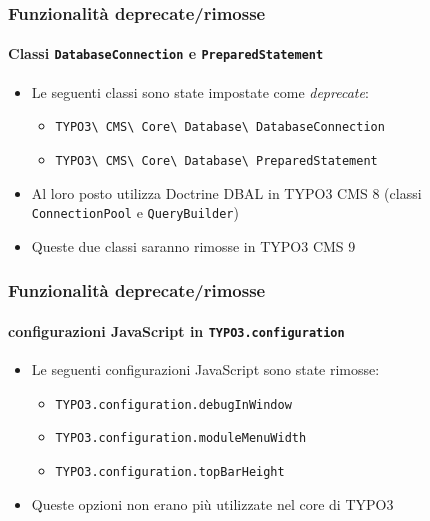 \begin{frame}[fragile]
	\frametitle{Funzionalità deprecate/rimosse}
	\framesubtitle{Classi \texttt{DatabaseConnection} e \texttt{PreparedStatement}}

	\begin{itemize}
		\item Le seguenti classi sono state impostate come \textit{deprecate}:
			\begin{itemize}
				\item \texttt{TYPO3\textbackslash
						CMS\textbackslash
						Core\textbackslash
						Database\textbackslash
						DatabaseConnection}
				\item \texttt{TYPO3\textbackslash
						CMS\textbackslash
						Core\textbackslash
						Database\textbackslash
						PreparedStatement}
			\end{itemize}
		\item Al loro posto utilizza Doctrine DBAL in TYPO3 CMS 8\newline
				(classi \texttt{ConnectionPool} e \texttt{QueryBuilder})
		\item Queste due classi saranno rimosse in TYPO3 CMS 9
	\end{itemize}

\end{frame}


\begin{frame}[fragile]
	\frametitle{Funzionalità deprecate/rimosse}
	\framesubtitle{configurazioni JavaScript in \texttt{TYPO3.configuration}}

	\begin{itemize}
		\item Le seguenti configurazioni JavaScript sono state rimosse:

		\begin{itemize}
			\item \texttt{TYPO3.configuration.debugInWindow}
			\item \texttt{TYPO3.configuration.moduleMenuWidth}
			\item \texttt{TYPO3.configuration.topBarHeight}
		\end{itemize}

		\item Queste opzioni non erano più utilizzate nel core di TYPO3

	\end{itemize}

\end{frame}


